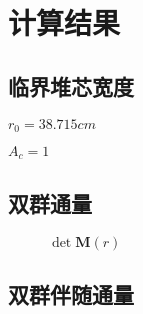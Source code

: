 \section{计算结果}
\label{sec:results}

\subsection{临界堆芯宽度}

$r_0=38.715\si{cm}$

$A_c=1$

\subsection{双群通量}

\begin{figure}[H]
    \centering
    
    \caption{$\det \pmb{M}(r)$}
    \label{fig:flux_r}
\end{figure}

\subsection{双群伴随通量}
